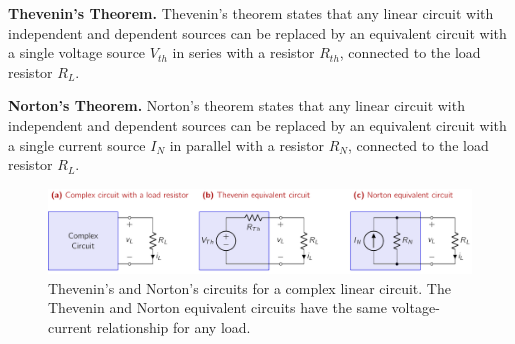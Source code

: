 \noindent\textbf{Thevenin's Theorem.} Thevenin's theorem states that any linear circuit with independent and dependent sources can be replaced by an equivalent circuit with a single voltage source $V_{th}$ in series with a resistor $R_{th}$, connected to the load resistor $R_L$. 

\noindent\textbf{Norton's Theorem.} Norton's theorem states that any linear circuit with independent and dependent sources can be replaced by an equivalent circuit with a single current source $I_{N}$ in parallel with a resistor $R_{N}$, connected to the load resistor $R_L$.
\begin{figure}[t]
    \centering
    \includegraphics[width=\textwidth]{figure/fig02-05.pdf}
    \caption{Thevenin's and Norton's circuits for a complex linear circuit. The Thevenin and Norton equivalent circuits have the same voltage-current relationship for any load.}
    \label{fig:02-05}
\end{figure}

